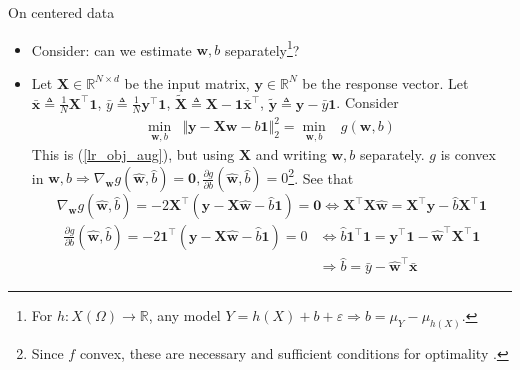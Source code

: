 \documentclass{beamer}
\numberwithin{equation}{section}
\newcommand{\aref}[1]{\alert{\ref{#1}}}
\begin{document}
\begin{frame}{On centered data}
    \begin{itemize}
        \item
        Consider: can we estimate $ \mathbf{w}, b $ separately\footnote{
            For $ h : X(\Omega) \rightarrow \mathbb{R} $, any model
            $ Y = h(X) + b + \varepsilon \Rightarrow b = \mu_Y - \mu_{h(X)} $.
        }?

        \item
        Let $ \mathbf{X} \in \mathbb{R}^{N \times d} $ be the input matrix,
        $ \mathbf{y} \in \mathbb{R}^N $ be the response vector. Let
        $ \bar{\mathbf{x}} \triangleq \frac{1}{N}\mathbf{X}^\top\mathbf{1} $,
        $ \bar{y} \triangleq \frac{1}{N}\mathbf{y}^\top\mathbf{1} $,
        $ \tilde{\mathbf{X}} \triangleq \mathbf{X} -
        \mathbf{1}\bar{\mathbf{x}}^\top $, $ \tilde{\mathbf{y}} \triangleq
        \mathbf{y} - \bar{y}\mathbf{1} $. Consider
        \begin{equation*}
            \begin{array}{lll}
                \displaystyle\min_{\mathbf{w}, b} &
                \Vert\mathbf{y} - \mathbf{Xw} - b\mathbf{1}\Vert_2^2 =
                \displaystyle\min_{\mathbf{w}, b} & g(\mathbf{w}, b)
            \end{array}
        \end{equation*}
        This is (\aref{lr_obj_aug}), but using $ \mathbf{X} $ and writing
        $ \mathbf{w}, b $ separately. $ g $ is convex in $ \mathbf{w}, b
        \Rightarrow \nabla_\mathbf{w}g(\hat{\mathbf{w}}, \hat{b}) =
        \mathbf{0}, \frac{\partial g}{\partial b}(\hat{\mathbf{w}}, \hat{b})
        = 0 $\footnote{
            Since $ f $ convex, these are necessary and sufficient conditions
            for optimality \cite{bv_convex_opt}.
        }. See that
        \begin{equation*}
            \nabla_\mathbf{w} g(\hat{\mathbf{w}}, \hat{b}) =
            -2\mathbf{X}^\top(\mathbf{y} - \mathbf{X}\hat{\mathbf{w}} -
            \hat{b}\mathbf{1}) = \mathbf{0} \Leftrightarrow
            \mathbf{X}^\top\mathbf{X}\hat{\mathbf{w}} =
            \mathbf{X}^\top\mathbf{y} - \hat{b}\mathbf{X}^\top\mathbf{1}            
        \end{equation*}
        \begin{equation*}
            \begin{split}
                \frac{\partial g}{\partial b}(\hat{\mathbf{w}}, \hat{b}) =
	            -2\mathbf{1}^\top(\mathbf{y} - \mathbf{X}\hat{\mathbf{w}} -
	            \hat{b}\mathbf{1}) = 0 & \Leftrightarrow
	            \hat{b}\mathbf{1}^\top\mathbf{1} = \mathbf{y}^\top\mathbf{1} -
	            \hat{\mathbf{w}}^\top\mathbf{X}^\top\mathbf{1} \\
	            & \Rightarrow \hat{b} = \bar{y} -
	                \hat{\mathbf{w}}^\top\bar{\mathbf{x}}
            \end{split}
        \end{equation*}        
    \end{itemize}

    \medskip
\end{frame}
\end{document}
